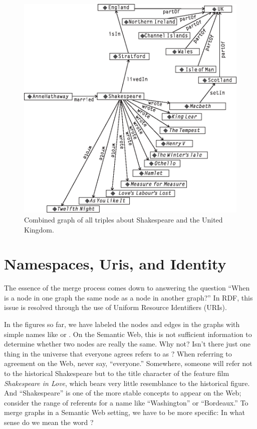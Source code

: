 \begin{figure}
    \centering
    \includegraphics[width=5.0in]{media/ch3/f03-06-9780123859655.eps}
    \caption{Combined graph of all triples about Shakespeare and the United Kingdom.}
    \label{fig:ch3.6}
\end{figure}



\section{Namespaces, Uris, and Identity}

The essence of the merge process comes down to answering the question ``When is
a node in one graph the same node as a node in another graph?'' In RDF,
this issue is resolved through the use of Uniform Resource Identifiers
(URIs).

In the figures so far, we have labeled the nodes and edges in the graphs
with simple names like  or . On the Semantic Web, this
is not sufficient information to determine whether two nodes are really
the same. Why not? Isn't there just one thing in the universe that
everyone agrees refers to as ? When referring to agreement on
the Web, never say, ``everyone.'' Somewhere, someone will refer not to
the historical Shakespeare but to the title character of the feature
film \emph{Shakespeare in Love}, which bears very little resemblance to
the historical figure. And ``Shakespeare'' is one of the more stable
concepts to appear on the Web; consider the range of referents for a
name like ``Washington'' or ``Bordeaux.'' To merge graphs in a Semantic
Web setting, we have to be more specific: In what sense do we mean the
word ?

